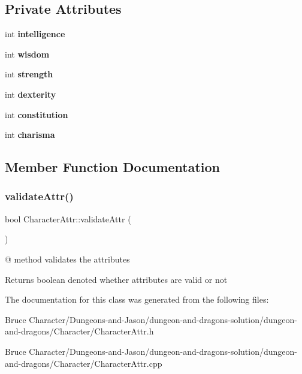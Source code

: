 \subsection*{Private Attributes}
\begin{DoxyCompactItemize}
\item 
\hypertarget{class_character_attr_a86dd9003fe0473576f283f251fd9b44b}{}\label{class_character_attr_a86dd9003fe0473576f283f251fd9b44b} 
int {\bfseries intelligence}
\item 
\hypertarget{class_character_attr_a7c7dd945bae7d7d5f534c9ce550aff47}{}\label{class_character_attr_a7c7dd945bae7d7d5f534c9ce550aff47} 
int {\bfseries wisdom}
\item 
\hypertarget{class_character_attr_a55c8176dbc9915758f23cb1650b21dfe}{}\label{class_character_attr_a55c8176dbc9915758f23cb1650b21dfe} 
int {\bfseries strength}
\item 
\hypertarget{class_character_attr_a152bbb1b640d28ab94f60e5b4f233154}{}\label{class_character_attr_a152bbb1b640d28ab94f60e5b4f233154} 
int {\bfseries dexterity}
\item 
\hypertarget{class_character_attr_a7181da4111c9a43fd5327f2440d98b29}{}\label{class_character_attr_a7181da4111c9a43fd5327f2440d98b29} 
int {\bfseries constitution}
\item 
\hypertarget{class_character_attr_ac19ce07a385c209d02ac3b69fc5c9ef4}{}\label{class_character_attr_ac19ce07a385c209d02ac3b69fc5c9ef4} 
int {\bfseries charisma}
\end{DoxyCompactItemize}


\subsection{Member Function Documentation}
\hypertarget{class_character_attr_ad66d6304128855485a07bdffa0d28e7b}{}\label{class_character_attr_ad66d6304128855485a07bdffa0d28e7b} 
\subsubsection{\texorpdfstring{validate\+Attr()}{validateAttr()}}
{\footnotesize\ttfamily bool Character\+Attr\+::validate\+Attr (\begin{DoxyParamCaption}{ }\end{DoxyParamCaption})}

@ method validates the attributes \begin{DoxyReturn}{Returns}
boolean denoted whether attributes are valid or not 
\end{DoxyReturn}


The documentation for this class was generated from the following files\+:\begin{DoxyCompactItemize}
\item 
Bruce Character/\+Dungeons-\/and-\/\+Jason/dungeon-\/and-\/dragons-\/solution/dungeon-\/and-\/dragons/\+Character/Character\+Attr.\+h\item 
Bruce Character/\+Dungeons-\/and-\/\+Jason/dungeon-\/and-\/dragons-\/solution/dungeon-\/and-\/dragons/\+Character/Character\+Attr.\+cpp\end{DoxyCompactItemize}
